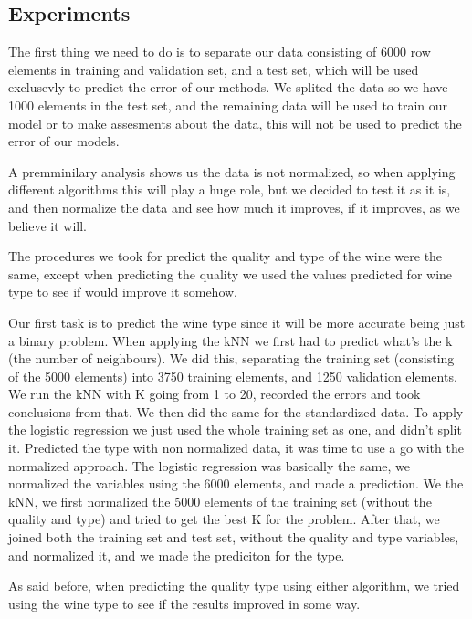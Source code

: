 \documentclass[twoside]{article}
\begin{document}
\begin{multicols}{2}
\section{Experiments}
\indent \par
	The first thing we need to do is to separate our data consisting of 6000 row elements in training and validation set, and a test set, which will be used exclusevly to predict the error of our methods. We splited the data so we have 1000 elements in the test set, and the remaining data will be used to train our model or to make assesments about the data, this will not be used to predict the error of our models.\par
	A premminilary analysis shows us the data is not normalized, so when applying different algorithms this will play a huge role, but we decided to test it as it is, and then normalize the data and see how much it improves, if it improves, as we believe it will.\par
	The procedures we took for predict the quality and type of the wine were the same, except when predicting the quality we used the values predicted for wine type to see if would improve it somehow.\par
	Our first task is to predict the wine type since it will be more accurate being just a binary problem. When applying the kNN we first had to predict what's the k (the number of neighbours). We did this, separating the training set (consisting of the 5000 elements) into 3750 training elements, and 1250 validation elements. We run the kNN with K going from 1 to 20, recorded the errors and took conclusions from that. We then did the same for the standardized data. To apply the logistic regression we just used the whole training set as one, and didn't split it. Predicted the type with non normalized data, it was time to use a go with the normalized approach. The logistic regression was basically the same, we normalized the variables using the 6000 elements, and made a prediction. We the kNN, we first normalized the 5000 elements of the training set (without the quality and type) and tried to get the best K for the problem. After that, we joined both the training set and test set, without the quality and type variables, and normalized it, and we made the prediciton for the type.\par
As said before, when predicting the quality type using either algorithm, we tried using the wine type to see if the results improved in some way.



\end{multicols}
\end{document}
